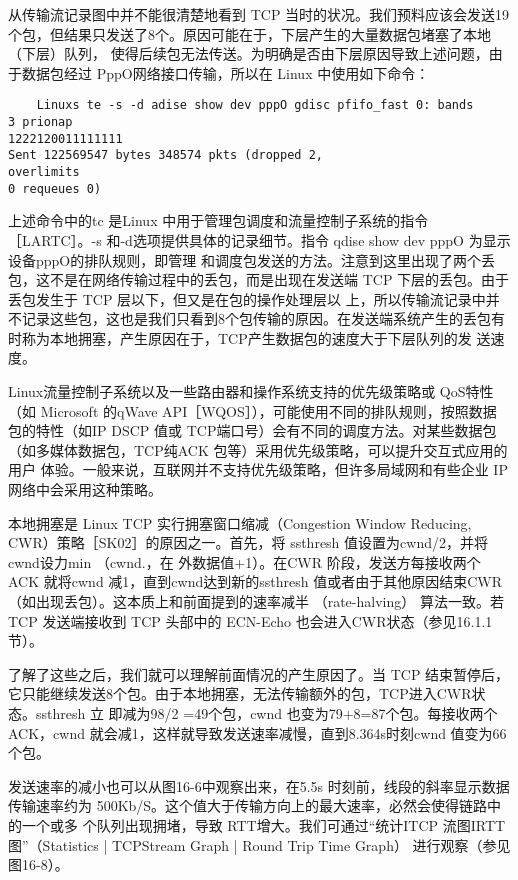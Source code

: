 从传输流记录图中并不能很清楚地看到 TCP 当时的状况。我们预料应该会发送19个包，但结果只发送了8个。原因可能在于，下层产生的大量数据包堵塞了本地（下层）队列，
使得后续包无法传送。为明确是否由下层原因导致上述问题，由于数据包经过 PppO网络接口传输，所以在 Linux 中使用如下命令：
\begin{verbatim}
    Linuxs te -s -d adise show dev pppO gdisc pfifo_fast 0: bands
3 prionap
1222120011111111
Sent 122569547 bytes 348574 pkts (dropped 2,
overlimits
0 requeues 0)
\end{verbatim}

上述命令中的tc 是Linux 中用于管理包调度和流量控制子系统的指令［LARTC］。-s 和-d选项提供具体的记录细节。指令 qdise show dev pppO 为显示设备pppO的排队规则，即管理
和调度包发送的方法。注意到这里出现了两个丢包，这不是在网络传输过程中的丢包，而是出现在发送端 TCP 下层的丢包。由于丢包发生于 TCP 层以下，但又是在包的操作处理层以
上，所以传输流记录中并不记录这些包，这也是我们只看到8个包传输的原因。在发送端系统产生的丢包有时称为本地拥塞，产生原因在于，TCP产生数据包的速度大于下层队列的发
送速度。

\begin{tcolorbox}
    Linux流量控制子系统以及一些路由器和操作系统支持的优先级策略或 QoS特性（如 Microsoft 的qWave API［WQOS］），可能使用不同的排队规则，按照数据
    包的特性（如IP DSCP 值或 TCP端口号）会有不同的调度方法。对某些数据包（如多媒体数据包，TCP纯ACK 包等）采用优先级策略，可以提升交互式应用的用户
    体验。一般来说，互联网并不支持优先级策略，但许多局域网和有些企业 IP 网络中会采用这种策略。
\end{tcolorbox}

本地拥塞是 Linux TCP 实行拥塞窗口缩减（Congestion Window Reducing, CWR）策略［SK02］的原因之一。首先，将 ssthresh 值设置为cwnd/2，并将 cwnd设力min （cwnd.，在
外数据值+1）。在CWR 阶段，发送方每接收两个 ACK 就将cwnd 减1，直到cwnd达到新的ssthresh 值或者由于其他原因结束CWR（如出现丢包）。这本质上和前面提到的速率减半
（rate-halving） 算法一致。若 TCP 发送端接收到 TCP 头部中的 ECN-Echo 也会进入CWR状态（参见16.1.1节）。

了解了这些之后，我们就可以理解前面情况的产生原因了。当 TCP 结束暂停后，它只能继续发送8个包。由于本地拥塞，无法传输额外的包，TCP进入CWR状态。ssthresh 立
即减为98/2 =49个包，cwnd 也变为79+8=87个包。每接收两个 ACK，cwnd 就会减1，这样就导致发送速率减慢，直到8.364s时刻cwnd 值变为66个包。

发送速率的减小也可以从图16-6中观察出来，在5.5s 时刻前，线段的斜率显示数据传输速率约为 500Kb/S。这个值大于传输方向上的最大速率，必然会使得链路中的一个或多
个队列出现拥堵，导致 RTT增大。我们可通过“统计ITCP 流图IRTT 图”（Statistics | TCPStream Graph | Round Trip Time Graph） 进行观察（参见图16-8）。
